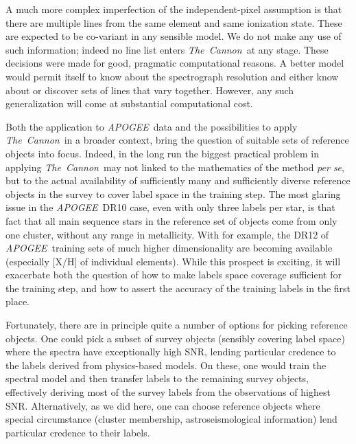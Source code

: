 \documentclass[12pt, preprint]{aastex}
\newcommand{\tc}{\textsl{The~Cannon}}
\newcommand{\apogee}{\textsl{APOGEE}}
\begin{document}
A much more complex imperfection of the independent-pixel assumption is 
 that there are multiple lines from the same element and same ionization state.
These are expected to be co-variant in any sensible model.
We do not make any use of such information; indeed no line list enters
\tc\ at any stage.
These decisions were made for good, pragmatic computational reasons.
A better model would permit itself to know about the spectrograph
resolution and either know about or discover sets of lines that vary
together.
However, any such generalization will come at substantial computational cost.

Both the application to \apogee\ data and the possibilities to apply \tc\ in a broader context, bring the question of suitable sets of reference objects into focus. Indeed, in the long run the biggest practical problem in applying \tc\ may not linked to the mathematics of the method \textit{per se}, but to the actual availability of sufficiently many and sufficiently diverse reference objects in the survey to cover label space in the training step. The most glaring issue in the \apogee\ DR10 case, even with only three labels per star, is that fact that all main sequence stars in the reference set of objects come from only one cluster, without any range in metallicity. With for example, the DR12 of \apogee\ training sets of much higher dimensionality are becoming available (especially [X/H] of individual elements). While this prospect is exciting, it will exacerbate both the question of how to make labels space coverage sufficient for the training step, and how to assert the accuracy of the training labels in the first place. 

Fortunately, there are in principle quite a number of options for picking reference objects. One could pick a subset of survey objects (sensibly covering label space) where the spectra have exceptionally high SNR, 
lending particular credence to the labels derived from physics-based models. On these, one would train the spectral model and then transfer labels to the remaining survey objects, effectively deriving most of the survey labels from the observations of highest SNR.
Alternatively, as we did here, one can choose reference objects where special circumstance (cluster membership, astroseismological information) lend particular credence to their labels. 
\end{document}
